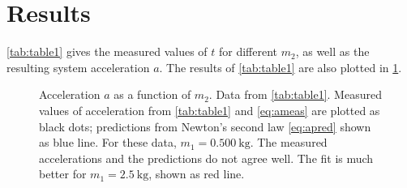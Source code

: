 ﻿\documentclass[reprint,amsmath,amssymb,aps]{revtex4-2}
\begin{document}
%






\section{Results}
\cref{tab:table1} gives the measured values of $t$ for different $m_2$, as well as the resulting system acceleration $a$. The results of \cref{tab:table1} are also plotted in \cref{fig:fig1}.

\begin{figure}
\begin{center}

\end{center}
\caption{\label{fig:fig1} Acceleration $a$ as a function of $m_2$. Data from \cref{tab:table1}. Measured values of acceleration from \cref{tab:table1} and \cref{eq:ameas} are plotted as black dots; predictions from Newton's second law \cref{eq:apred} shown as blue line. For these data, $m_1=\qty{0.500}{\kilo\gram}$. The measured accelerations and the predictions do not agree well. The fit is much better for $m_1=\qty{2.5}{\kilo\gram}$, shown as red line.} 
\end{figure}
%
\end{document}
